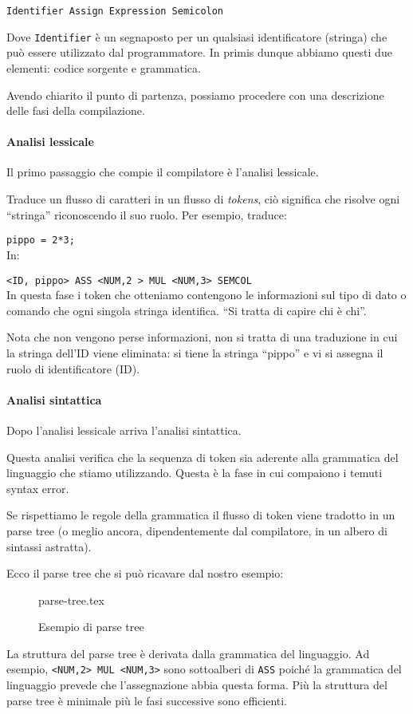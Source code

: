 \documentclass[class=book, crop=false, oneside, 12pt]{standalone}
\begin{document}
\texttt{Identifier Assign Expression Semicolon}

Dove \texttt{Identifier} è un segnaposto per un qualsiasi identificatore (stringa) che può essere utilizzato dal programmatore.
In primis dunque abbiamo questi due elementi: codice sorgente e grammatica.

Avendo chiarito il punto di partenza, possiamo procedere con una descrizione delle fasi della compilazione.

\paragraph{Analisi lessicale}
Il primo passaggio che compie il compilatore è l’analisi lessicale.

Traduce un flusso di caratteri in un flusso di \emph{tokens}, ciò significa che risolve ogni “stringa” riconoscendo il suo ruolo. Per esempio, traduce:

\texttt{pippo = 2*3;}\\
In:

\texttt{<ID, pippo> ASS <NUM,2 > MUL <NUM,3> SEMCOL}\\
In questa fase i token che otteniamo contengono le informazioni sul tipo di dato o comando che ogni singola stringa identifica. “Si tratta di capire chi è chi”.

Nota che non vengono perse informazioni, non si tratta di una traduzione in cui la stringa dell’ID viene eliminata: si tiene la stringa “pippo” e vi si assegna il ruolo di identificatore (ID).

\paragraph{Analisi sintattica}
Dopo l’analisi lessicale arriva l’analisi sintattica.

Questa analisi verifica che la sequenza di token sia aderente alla grammatica del linguaggio che stiamo utilizzando. Questa è la fase in cui compaiono i temuti syntax error.

Se rispettiamo le regole della grammatica il flusso di token viene tradotto in un parse tree (o meglio ancora, dipendentemente dal compilatore, in un albero di sintassi astratta).

Ecco il parse tree che si può ricavare dal nostro esempio:
\begin{figure}[H]
	\centering
	{parse-tree.tex}
	\caption{Esempio di parse tree}
\end{figure}
La struttura del parse tree è derivata dalla grammatica del linguaggio. Ad esempio, \texttt{<NUM,2> MUL <NUM,3>} sono sottoalberi di \texttt{ASS} poiché la grammatica del linguaggio prevede che l’assegnazione abbia questa forma.
Più la struttura del parse tree è minimale più le fasi successive sono efficienti.
\end{document}
